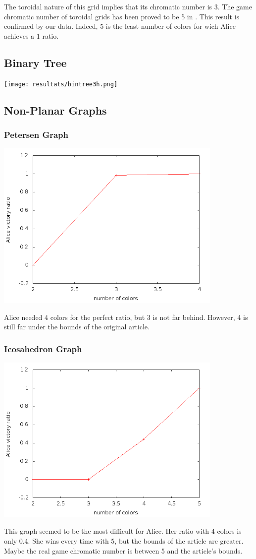 The toroidal nature of this grid implies that its chromatic number is 3. The game chromatic number of toroidal grids has been proved to be 5 in \cite{Raspaud20091183}. This result is confirmed by our data. Indeed, 5 is the least number of colors for wich Alice achieves a 1 ratio.

\subsection{Binary Tree}

\texttt{[image: resultats/bintree3h.png]}

\subsection{Non-Planar Graphs}

\subsubsection{Petersen Graph}

\includegraphics[width=11cm]{resultats/petersen.png}

Alice needed 4 colors for the perfect ratio, but 3 is not far behind. However, 4 is still far under the bounds of the original article.

\subsubsection{Icosahedron Graph}

\includegraphics[width=11cm]{resultats/icosaedre.png}

This graph seemed to be the most difficult for Alice. Her ratio with 4 colors is only 0.4. She wins every time with 5, but the bounds of the article are greater. Maybe the real game chromatic number is between 5 and the article's bounds.